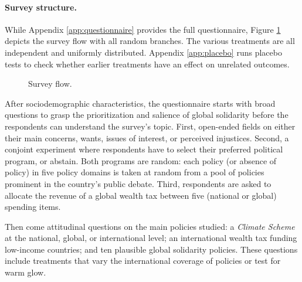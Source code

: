 \documentclass[12pt,english]{article}
\begin{document}
\begin{bibunit}
\paragraph{Survey structure.}
While Appendix \ref{app:questionnaire} provides the full questionnaire, Figure \ref{fig:flow} depicts the survey flow with all random branches. The various treatments are all independent and uniformly distributed. Appendix \ref{app:placebo} runs placebo tests to check whether earlier treatments have an effect on unrelated outcomes. 
\begin{figure}[h!]
    \caption[Survey flow]{Survey flow.
    }\label{fig:flow}
\end{figure}

After sociodemographic characteristics, the questionnaire starts with broad questions to grasp the prioritization and salience of global solidarity before the respondents can understand the survey's topic. First, open-ended fields on either their main concerns, wants, issues of interest, or perceived injustices. Second, a conjoint experiment where respondents have to select their preferred political program, or abstain. Both programs are random: each policy (or absence of policy) in five policy domains is taken at random from a pool of policies prominent in the country's public debate. Third, respondents are asked to allocate the revenue of a global wealth tax between five (national or global) spending items. 

Then come attitudinal questions on the main policies studied: a \textit{Climate Scheme} at the national, global, or international level; an international wealth tax funding low-income countries; and ten plausible global solidarity policies. These questions include treatments that vary the international coverage of policies or test for warm glow. 


\end{bibunit}
\end{document}
